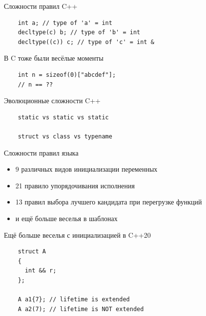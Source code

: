 \documentclass[unknownkeysallowed,xcolor=table]{beamer}
\begin{document}
\begin{frame}[fragile]{Сложности правил C++}
  \begin{lstlisting}
    int a; // type of 'a' = int
    decltype(c) b; // type of 'b' = int
    decltype((c)) c; // type of 'c' = int &
  \end{lstlisting}
\end{frame}

\begin{frame}[fragile]{В C тоже были весёлые моменты}
  \begin{lstlisting}
    int n = sizeof(0)["abcdef"];
    // n == ??
  \end{lstlisting}
\end{frame}

\begin{frame}[fragile]{Эволюционные сложности C++}
  \begin{lstlisting}
    static vs static vs static

    struct vs class vs typename
  \end{lstlisting}
\end{frame}

\begin{frame}{Сложности правил языка}
  \begin{itemize}
    \item 9 различных видов инициализации переменных \vspace{2em}
    \item 21 правило упорядочивания исполнения \vspace{2em}
    \item 13 правил выбора лучшего кандидата при перегрузке функций \vspace{2em}
    \item и ещё больше веселья в шаблонах
  \end{itemize}
\end{frame}

\begin{frame}[fragile]{Ещё больше веселья с инициализацией в C++20}
  \begin{lstlisting}
    struct A
    {
      int && r;
    };

    A a1{7}; // lifetime is extended
    A a2(7); // lifetime is NOT extended
  \end{lstlisting}
\end{frame}
\end{document}
